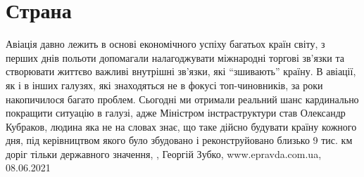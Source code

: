  
 
 
 
 
\chapter{Страна}

Авіація давно лежить в основі економічного успіху багатьох країн світу, з
перших днів польоти допомагали налагоджувати міжнародні торгові зв’язки та
створювати життєво важливі внутрішні зв’язки, які \enquote{зшивають} країну.  В
авіації, як і в інших галузях, які знаходяться не в фокусі топ-чиновників, за
роки накопичилося багато проблем.  Сьогодні ми отримали реальний шанс
кардинально покращити ситуацію в галузі, адже Міністром інстраструктури став
Олександр Кубраков, людина яка не на словах знає, що таке дійсно будувати
країну кожного дня, під керівництвом якого було збудовано і реконструйовано
близько 9 тис. км доріг тільки державного значення,
, Георгій Зубко, www.epravda.com.ua, 08.06.2021

